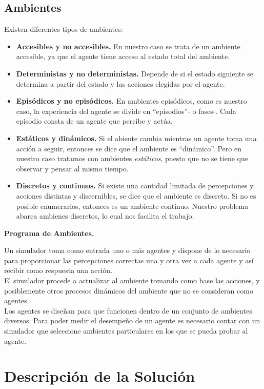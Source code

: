 \documentclass[a4paper,12pt,oneside]{book}
\begin{document}
\section{Ambientes}
Existen diferentes tipos de ambientes:
\begin{itemize}
\item {\bf Accesibles y no accesibles.} En nuestro caso se trata de un
  ambiente accesible, ya que el agente tiene acceso al estado total
  del ambiente.
\item {\bf Deterministas y no deterministas.} Depende de si el estado
  siguiente se determina a partir del estado y las acciones elegidas
  por el agente.
\item {\bf Episódicos y no episódicos.} En ambientes episódicos, como
  es nuestro caso, la experiencia del agente se divide en
  ``episodios''- o fases-. Cada episodio consta de un agente que
  percibe y actúa.
\item {\bf Estáticos y dinámicos.} Si el abiente cambia mientras un
  agente toma una acción a seguir, entonces se dice que el ambiente es
  ``dinámico''. Pero en nuestro caso tratamos con ambientes {\it
    estáticos}, puesto que no se tiene que observar y pensar al mismo tiempo.
\item {\bf Discretos y continuos.} Si existe una cantidad limitada de
  percepciones y acciones distintas y discernibles, se dice que el
  ambiente es discreto. Si no es posible enumerarlos, entonces es un
  ambiente continuo. Nuestro problema abarca ambienes discretos, lo
  cual nos facilita el trabajo.
\end{itemize}

{\bf Programa de Ambientes.}


Un simulador toma como entrada uno o más agentes y dispone de lo
necesario para proporcionar las percepciones correctas una y otra vez
a cada agente y así recibir como respuesta una acción.\\

El simulador procede a actualizar  al ambiente tomando como base las
acciones, y posiblemente otros procesos dinámicos del ambiente que no
se consideran como agentes.\\

Los agentes se diseñan para que funcionen dentro de un conjunto de
ambientes diversos. Para poder medir el desempeño de un agente es
necesario contar con un simulador que seleccione ambientes
particulares en los que se pueda probar al agente.

\chapter{Descripción de la Solución}
\end{document}
